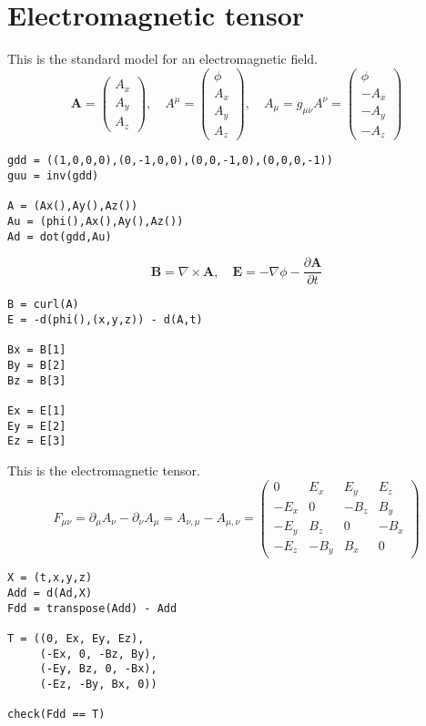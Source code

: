 

\section*{Electromagnetic tensor}

This is the standard model for an electromagnetic field.
\begin{equation*}
\mathbf A=\begin{pmatrix}A_x\\A_y\\A_z\end{pmatrix},\quad
A^\mu=\begin{pmatrix}\phi\\A_x\\A_y\\A_z\end{pmatrix},\quad
A_\mu=g_{\mu\nu}A^\nu=\begin{pmatrix}\phi\\-A_x\\-A_y\\-A_z\end{pmatrix}
\end{equation*}
{\footnotesize\begin{verbatim}
gdd = ((1,0,0,0),(0,-1,0,0),(0,0,-1,0),(0,0,0,-1))
guu = inv(gdd)

A = (Ax(),Ay(),Az())
Au = (phi(),Ax(),Ay(),Az())
Ad = dot(gdd,Au)
\end{verbatim}}%

\begin{equation*}
\mathbf B=\nabla\times\mathbf A,\quad
\mathbf E=-\nabla\phi-\frac{\partial\mathbf A}{\partial t}
\end{equation*}
{\footnotesize\begin{verbatim}
B = curl(A)
E = -d(phi(),(x,y,z)) - d(A,t)

Bx = B[1]
By = B[2]
Bz = B[3]

Ex = E[1]
Ey = E[2]
Ez = E[3]
\end{verbatim}}%

This is the electromagnetic tensor.
\begin{equation*}
F_{\mu\nu}
=\partial_\mu A_\nu-\partial_\nu A_\mu
=A_{\nu,\mu}-A_{\mu,\nu}
=\begin{pmatrix}
0 & E_x & E_y & E_z
\\
-E_x & 0 & -B_z & B_y
\\
-E_y & B_z & 0 & -B_x
\\
-E_z & -B_y & B_x & 0
\end{pmatrix}
\end{equation*}
{\footnotesize\begin{verbatim}
X = (t,x,y,z)
Add = d(Ad,X)
Fdd = transpose(Add) - Add

T = ((0, Ex, Ey, Ez),
     (-Ex, 0, -Bz, By),
     (-Ey, Bz, 0, -Bx),
     (-Ez, -By, Bx, 0))

check(Fdd == T)
\end{verbatim}}%

